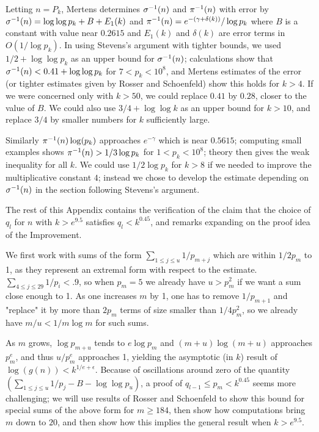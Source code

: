 \documentclass[12pt,leqno]{article}
\begin{document}
Letting $n=P_k$, Mertens determines ${\sigma}^{-1}(n)$ and ${\pi}^{-1}(n)$ with error by
${\sigma}^{-1}(n) = \log\log p_k + B + E_1(k)$ and 
${\pi}^{-1}(n) = e^{-(\gamma + \delta(k))}/\log p_k$ where
$B$ is a constant with value near $0.2615$ and
$E_1(k)$ and $\delta(k)$ are error terms in $O(1/\log p_k)$.  In using Stevens's argument
with tighter bounds, we used $1/2 + \log\log p_k$ as an upper bound for ${\sigma}^{-1}(n)$; calculations 
show that ${\sigma}^{-1}(n) < 0.41 + \log\log p_k$ for $7 \lt p_k \lt 10^8$, and Mertens estimates
of the error (or tighter estimates given by Rosser and Schoenfeld) show this holds for $k \gt 4$.
If we were concerned only with $k \gt 50$, we could replace $0.41$ by $0.28$, closer to the
value of $B$.  We could also use $3/4 + \log\log k$ as an upper bound for $k \gt 10$, and
replace $3/4$ by smaller numbers for $k$ sufficiently large.

Similarly ${\pi}^{-1}(n) \log(p_k)$ approaches $e^{-\gamma}$ which is near $0.5615$; computing
small examples shows ${\pi}^{-1}(n) > 1/3\log p_k$ for $1 \lt p_k \lt 10^8$; theory then gives the
weak inequality for all $k$.  We could use $1/2\log p_k$ for $k>8$ if we needed to improve the
multiplicative constant $4$; instead we chose to develop the estimate depending on ${\sigma}^{-1}(n)$
in the section following Stevens's argument.

The rest of this Appendix contains the verification of the claim
that the choice of $q_l$ for $n$ with $k \gt e^{9.5}$ satisfies $q_l \lt k^{0.45}$, and
remarks expanding on the proof idea of the Improvement.

We first work with sums of the form $\sum_{1 \leq j \leq u} 1/p_{m+j}$
which are within $1/2p_m$ to 1,
as they represent an extremal form with respect to the estimate. 
$\sum_{4 \leq j \leq 29} 1/p_i \lt .9$, so when $p_m=5$ we already have $u \gt p_m^2$ if we want
a sum close enough to 1. As one increases $m$ by 1, one
has to remove $1/p_{m+1}$ and "replace" it by more than $2p_m$ terms of size smaller than 
$1/4p_m^2$, so we already have $m/u \lt 1/m \log m$ for such sums.

As $m$ grows, $\log p_{m+u}$ tends to $e\log p_m$ and 
$(m+u) \log (m+u)$ approaches $p_m^e$, and thus $u/p_m^e$ approaches 1, yielding the
asymptotic (in $k$) result of $\log(g(n)) \lt k^{1/e + \epsilon}$.  Because of oscillations
around zero of the quantity $(\sum_{1 \leq j \leq u} 1/p_j -B - \log\log p_u)$, a proof
of $q_{l-1} \leq p_m \lt k^{0.45}$ seems more challenging;  we will use results of
Rosser and Schoenfeld \cite{RS} to show this bound for special sums of the above form for $m \geq 184$,
then show how computations bring $m$ down to $20$, and then show how this implies the
general result when $k \gt e^{9.5}$.
\end{document}
